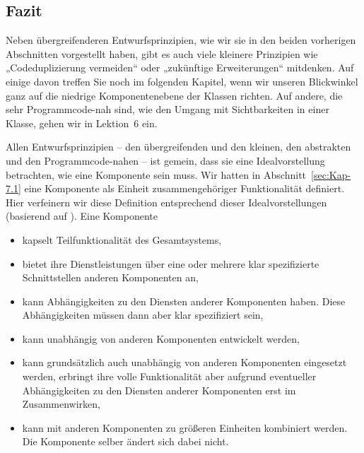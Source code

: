 \vspace{2mm} %

\subsection{Fazit}
\label{sec:Kap-7.2.3}

Neben übergreifenderen Entwurfsprinzipien, wie wir sie in den beiden vorherigen Abschnitten vorgestellt haben, gibt es auch viele kleinere Prinzipien wie „Codeduplizierung vermeiden“ oder „zukünftige Erweiterungen“ mitdenken. Auf einige davon treffen Sie noch im folgenden Kapitel, wenn wir unseren Blickwinkel ganz auf die niedrige Komponentenebene der Klassen richten. Auf andere, die sehr Programmcode-nah sind, wie den Umgang mit Sichtbarkeiten in einer Klasse, gehen wir in Lektion~6 ein.

\vspace{2mm} %
  
Allen Entwurfsprinzipien -- den übergreifenden und den kleinen, den abstrakten und den Programmcode-nahen -- ist gemein, dass sie eine Idealvorstellung betrachten, wie eine Komponente sein muss. Wir hatten in Abschnitt~\ref{sec:Kap-7.1} eine Komponente als Einheit zusammengehöriger Funktionalität definiert. Hier verfeinern wir diese Definition entsprechend dieser Idealvorstellungen (basierend auf \cite[309f.]{bro21}). Eine Komponente

\begin{itemize}
	\setlength{\itemsep}{2mm} %
	\item kapselt Teilfunktionalität des Gesamtsystems,
	\item bietet ihre Dienstleistungen über eine oder mehrere klar spezifizierte Schnittstellen anderen Komponenten an,
	\item kann Abhängigkeiten zu den Diensten anderer Komponenten haben. Diese Abhängigkeiten müssen dann aber klar spezifiziert sein,
	\item kann unabhängig von anderen Komponenten entwickelt werden,
	\item kann grundsätzlich auch unabhängig von anderen Komponenten eingesetzt werden, erbringt ihre volle Funktionalität aber aufgrund eventueller Abhängig\-keiten zu den Diensten anderer Komponenten erst im Zusammenwirken,
	\item kann mit anderen Komponenten zu größeren Einheiten kombiniert werden. Die Komponente selber ändert sich dabei nicht.
\end{itemize} 



